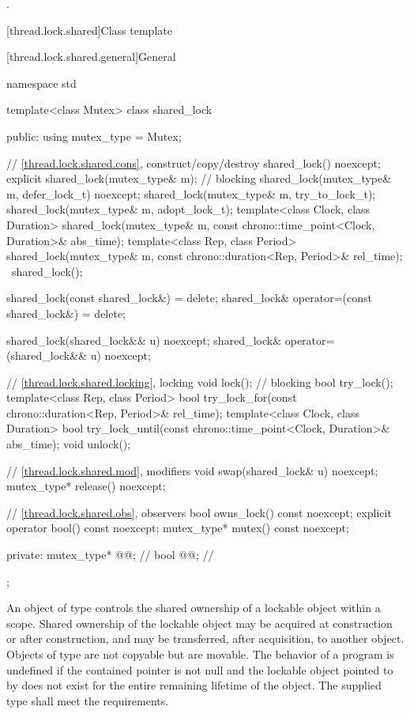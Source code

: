 \begin{itemdescr}
\pnum
\returns
{}.
\end{itemdescr}

[thread.lock.shared]{Class template }

[thread.lock.shared.general]{General}

%
\begin{codeblock}
namespace std {
  template<class Mutex>
  class shared_lock {
  public:
    using mutex_type = Mutex;

    // \ref{thread.lock.shared.cons}, construct/copy/destroy
    shared_lock() noexcept;
    explicit shared_lock(mutex_type& m);        // blocking
    shared_lock(mutex_type& m, defer_lock_t) noexcept;
    shared_lock(mutex_type& m, try_to_lock_t);
    shared_lock(mutex_type& m, adopt_lock_t);
    template<class Clock, class Duration>
      shared_lock(mutex_type& m, const chrono::time_point<Clock, Duration>& abs_time);
    template<class Rep, class Period>
      shared_lock(mutex_type& m, const chrono::duration<Rep, Period>& rel_time);
    ~shared_lock();

    shared_lock(const shared_lock&) = delete;
    shared_lock& operator=(const shared_lock&) = delete;

    shared_lock(shared_lock&& u) noexcept;
    shared_lock& operator=(shared_lock&& u) noexcept;

    // \ref{thread.lock.shared.locking}, locking
    void lock();                                // blocking
    bool try_lock();
    template<class Rep, class Period>
      bool try_lock_for(const chrono::duration<Rep, Period>& rel_time);
    template<class Clock, class Duration>
      bool try_lock_until(const chrono::time_point<Clock, Duration>& abs_time);
    void unlock();

    // \ref{thread.lock.shared.mod}, modifiers
    void swap(shared_lock& u) noexcept;
    mutex_type* release() noexcept;

    // \ref{thread.lock.shared.obs}, observers
    bool owns_lock() const noexcept;
    explicit operator bool() const noexcept;
    mutex_type* mutex() const noexcept;

  private:
    mutex_type* @@;                             // \expos
    bool @@;                                  // \expos
  };
}
\end{codeblock}

\pnum
An object of type  controls the shared ownership of a
lockable object within a scope. Shared ownership of the lockable object may be
acquired at construction or after construction, and may be transferred, after
acquisition, to another  object. Objects of type
 are not copyable but are movable. The behavior of a program
is undefined if the contained pointer  is not null and the lockable
object pointed to by  does not exist for the entire remaining
lifetime of the  object. The supplied
 type shall meet the 
requirements.

